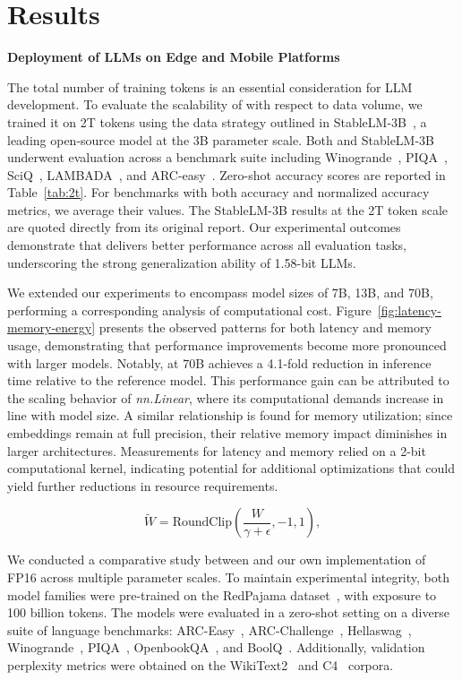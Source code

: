 \section{Results}

\textbf{Deployment of LLMs on Edge and Mobile Platforms}

The total number of training tokens is an essential consideration for LLM development. To evaluate the scalability of  with respect to data volume, we trained it on 2T tokens using the data strategy outlined in StableLM-3B~\cite{StableLM-3B-4E1T}, a leading open-source model at the 3B parameter scale. Both  and StableLM-3B underwent evaluation across a benchmark suite including Winogrande~\cite{winoGrande}, PIQA~\cite{piqa}, SciQ~\cite{sciq}, LAMBADA~\cite{lambada}, and ARC-easy~\cite{arc}. Zero-shot accuracy scores are reported in Table~\ref{tab:2t}. For benchmarks with both accuracy and normalized accuracy metrics, we average their values. The StableLM-3B results at the 2T token scale are quoted directly from its original report. Our experimental outcomes demonstrate that  delivers better performance across all evaluation tasks, underscoring the strong generalization ability of 1.58-bit LLMs.

We extended our experiments to encompass model sizes of 7B, 13B, and 70B, performing a corresponding analysis of computational cost. Figure~\ref{fig:latency-memory-energy} presents the observed patterns for both latency and memory usage, demonstrating that performance improvements become more pronounced with larger models. Notably,  at 70B achieves a 4.1-fold reduction in inference time relative to the  reference model. This performance gain can be attributed to the scaling behavior of \emph{nn.Linear}, where its computational demands increase in line with model size. A similar relationship is found for memory utilization; since embeddings remain at full precision, their relative memory impact diminishes in larger architectures. Measurements for latency and memory relied on a 2-bit computational kernel, indicating potential for additional optimizations that could yield further reductions in resource requirements.

\begin{equation}
    \widetilde{W} = \mathrm{RoundClip}(\frac{W}{\gamma + \epsilon}, -1, 1),
\end{equation}

We conducted a comparative study between  and our own implementation of FP16  across multiple parameter scales. To maintain experimental integrity, both model families were pre-trained on the RedPajama dataset~\cite{redpajama}, with exposure to 100 billion tokens. The models were evaluated in a zero-shot setting on a diverse suite of language benchmarks: ARC-Easy~\cite{arc}, ARC-Challenge~\cite{arc}, Hellaswag~\cite{hellaswag}, Winogrande~\cite{winoGrande}, PIQA~\cite{piqa}, OpenbookQA~\cite{openbookqa}, and BoolQ~\cite{boolq}. Additionally, validation perplexity metrics were obtained on the WikiText2~\cite{wikitext2} and C4~\cite{c4} corpora.

